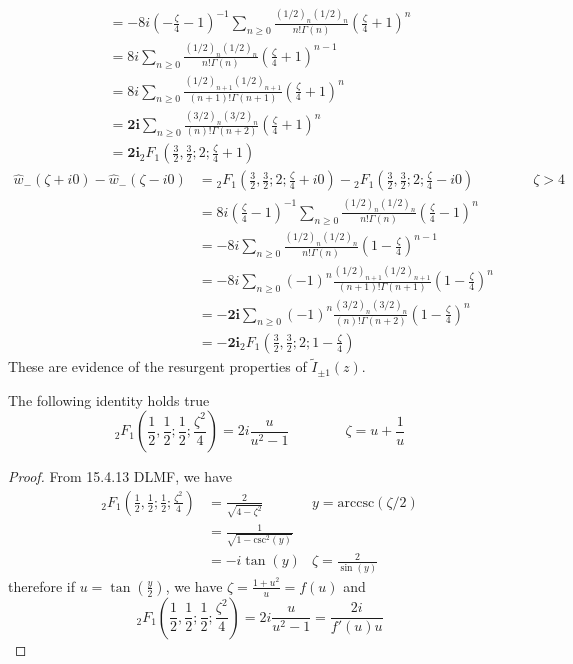 \documentclass[11pt,a4paper,twoside,leqno,noamsfonts]{amsart}
\numberwithin{equation}{section}
\begin{document}
\begin{example}[Bessel]
\begin{align*}
&=-8i\left(-\frac{\zeta}{4}-1\right)^{-1}\sum_{n\geq 0}\frac{(1/2)_n(1/2)_n}{n!\Gamma(n)}\left(\frac{\zeta}{4}+1\right)^n\\
&=8i\sum_{n\geq 0}\frac{(1/2)_n(1/2)_n}{n!\Gamma(n)}\left(\frac{\zeta}{4}+1\right)^{n-1} & \\
&=8i\sum_{n\geq 0}\frac{(1/2)_{n+1}(1/2)_{n+1}}{(n+1)!\Gamma(n+1)}\left(\frac{\zeta}{4}+1\right)^{n} &\\
&=\mathbf{2i}\sum_{n\geq 0}\frac{(3/2)_{n}(3/2)_{n}}{(n)!\Gamma(n+2)}\left(\frac{\zeta}{4}+1\right)^{n} & \\
&=\mathbf{2i}{}_2F_1\left(\frac{3}{2},\frac{3}{2};2;\frac{\zeta}{4}+1\right)
\end{align*}
\begin{align*}
\hat{w}_-(\zeta+i0)-\hat{w}_-(\zeta-i0)&={}_2F_1\left(\frac{3}{2},\frac{3}{2};2;\frac{\zeta}{4}+i0\right)-{}_2F_1\left(\frac{3}{2},\frac{3}{2};2;\frac{\zeta}{4}-i0\right)& \qquad\zeta>4\\
&=8i\left(\frac{\zeta}{4}-1\right)^{-1}\sum_{n\geq 0}\frac{(1/2)_n(1/2)_n}{n!\Gamma(n)}\left(\frac{\zeta}{4}-1\right)^n\\
&=-8i\sum_{n\geq 0}\frac{(1/2)_n(1/2)_n}{n!\Gamma(n)}\left(1-\frac{\zeta}{4}\right)^{n-1}\\
&=-8i\sum_{n\geq 0}(-1)^n\frac{(1/2)_{n+1}(1/2)_{n+1}}{(n+1)!\Gamma(n+1)}\left(1-\frac{\zeta}{4}\right)^{n}\\
&=\mathbf{-2i}\sum_{n\geq 0}(-1)^n\frac{(3/2)_{n}(3/2)_{n}}{(n)!\Gamma(n+2)}\left(1-\frac{\zeta}{4}\right)^{n}\\
&=\mathbf{-2i}{}_2F_1\left(\frac{3}{2},\frac{3}{2};2;1-\frac{\zeta}{4}\right)
\end{align*}
These are evidence of the resurgent properties of $\tilde{I}_{\pm 1}(z)$. 

\begin{lemma}
The following identity holds true
\begin{equation}
{}_2F_1\left(\frac{1}{2},\frac{1}{2};\frac{1}{2};\frac{\zeta^2}{4}\right)=2i\frac{u}{u^2-1}\qquad \qquad \zeta=u+\frac{1}{u}
\end{equation}
\end{lemma}
\begin{proof}
From 15.4.13 DLMF, we have
\begin{align*}
{}_2F_1\left(\frac{1}{2},\frac{1}{2};\frac{1}{2};\frac{\zeta^2}{4}\right)&=\frac{2}{\sqrt{4-\zeta^2}} & y=\mathrm{arccsc}(\zeta/2)\\
&=\frac{1}{\sqrt{1-\mathrm{csc}^2(y)}} & \\
&=-i\tan(y) &   \zeta=\frac{2}{\sin(y)}
\end{align*}
therefore if $u=\tan\left(\frac{y}{2}\right)$, we have $\zeta=\frac{1+u^2}{u}=f(u)$ and 
\begin{equation*}
{}_2F_1\left(\frac{1}{2},\frac{1}{2};\frac{1}{2};\frac{\zeta^2}{4}\right)=2i\frac{u}{u^2-1}=\frac{2i}{f'(u)u}
\end{equation*}  
\end{proof}


\end{example}
\end{document}
